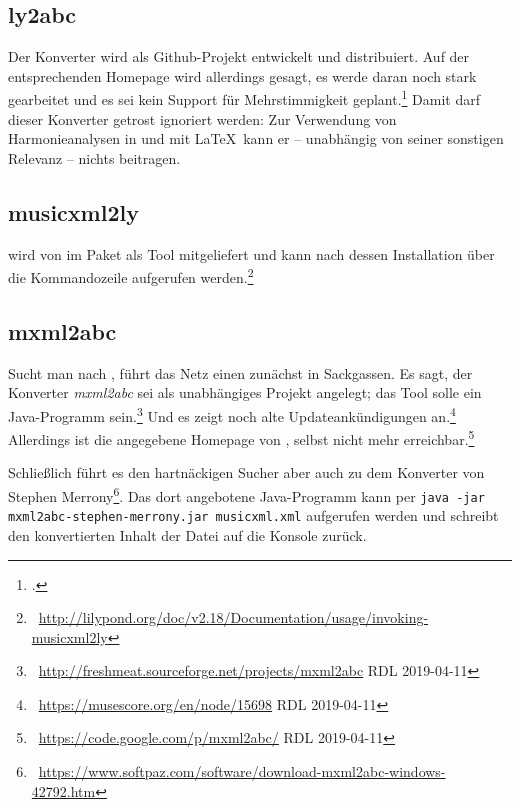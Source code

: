\subsection{ly2abc}

Der Konverter  wird als Github-Projekt entwickelt und distribuiert.
Auf der entsprechenden Homepage wird allerdings gesagt, es werde daran noch
stark gearbeitet und es sei kein Support für Mehrstimmigkeit
geplant.\footcite[vgl.][\nopage wp.]{ly2abc2019a} Damit darf dieser Konverter
getrost ignoriert werden: Zur Verwendung von Harmonieanalysen in und mit \LaTeX\
kann er -- unabhängig von seiner sonstigen Relevanz -- nichts beitragen.

\subsection{musicxml2ly}

 wird von  im Paket als Tool mitgeliefert und kann
nach dessen Installation über die Kommandozeile aufgerufen werden.\footnote{\ra\
\href{http://lilypond.org/doc/v2.18/Documentation/usage/invoking-musicxml2ly}
{http://lilypond.org/doc/v2.18/Documentation/usage/invoking-musicxml2ly}}

\subsection{mxml2abc}

Sucht man nach , führt das Netz einen zunächst in Sackgassen. Es
sagt, der Konverter \textit{mxml2abc} sei als unabhängiges Projekt angelegt; das
Tool solle ein Java-Programm sein.\footnote{\ra\
\href{http://freshmeat.sourceforge.net/projects/mxml2abc}
{http://freshmeat.sourceforge.net/projects/mxml2abc} RDL 2019-04-11} Und es
zeigt noch alte Updateankündigungen an.\footnote{\ra\
\href{https://musescore.org/en/node/15698} {https://musescore.org/en/node/15698}
RDL 2019-04-11} Allerdings ist die angegebene Homepage von ,
selbst nicht mehr erreichbar.\footnote{\ra\
\href{https://code.google.com/p/mxml2abc/}
{https://code.google.com/p/mxml2abc/} RDL 2019-04-11}
  
Schließlich führt es den hartnäckigen Sucher aber auch zu dem Konverter
\acc{mxml2abc} von Stephen Merrony\footnote{\ra\
\href{https://www.softpaz.com/software/download-mxml2abc-windows-42792.htm}
{https://www.softpaz.com/software/download-mxml2abc-windows-42792.htm}}. Das
dort angebotene Java-Programm kann per \texttt{java -jar
mxml2abc-stephen-merrony.jar musicxml.xml} aufgerufen werden und schreibt den
konvertierten Inhalt der Datei \acc{musicxml.xml} auf die Konsole zurück.

